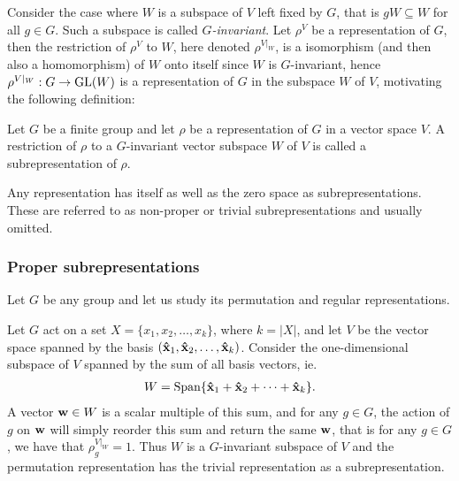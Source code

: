 Consider the case where $W$ is a subspace of $V$ left fixed by $G$, that is $gW \subseteq W$ for all $g \in G$. Such a subspace is called \textit{$G$-invariant}. Let $\rho^V$ be a representation of $G$, then the restriction of $\rho^V$ to $W$, here denoted $\rho^{V|_W}$, is a isomorphism (and then also a homomorphism) of $W$ onto itself since $W$ is $G$-invariant, hence $\rho^{V|_W}: G \rightarrow \text{GL}(W)$ is a representation of $G$ in the subspace $W$ of $V$, motivating the following definition:

\begin{definition}[Subrepresentation]\label{def:subrepr}
	Let $G$ be a finite group and let $\rho$ be a representation of $G$ in a vector space $V$. A restriction of $\rho$ to a $G$-invariant vector subspace $W$ of $V$ is called a subrepresentation of $\rho$.
\end{definition}


\begin{example}
	Any representation has itself as well as the zero space as subrepresentations. These are referred to as non-proper or trivial subrepresentations and usually omitted.
\end{example}

\subsubsection{Proper subrepresentations}

Let $G$ be any group and let us study its permutation and regular representations. 

\begin{example}\cite[Example 1.4.3.]{Sagan}\label{example:trivpermrepr}
	Let $G$ act on a set $X = \{x_1, x_2, \dots, x_k\}$, where $k = |X|$, and let $V$ be the vector space spanned by the basis $(\mathbf{\hat{x}}_1, \mathbf{\hat{x}}_2, \dots, \mathbf{\hat{x}}_k)$. Consider the one-dimensional subspace of $V$ spanned by the sum of all basis vectors, ie. 
	\begin{align*}	
		W = \text{Span}\{ \mathbf{\hat{x}}_1 + \mathbf{\hat{x}}_2 + \dots + \mathbf{\hat{x}}_k \}.
	\end{align*}A vector $\mathbf{w} \in W$ is a scalar multiple of this sum, and for any $g \in G$, the action of $g$ on $\mathbf{w}$ will simply reorder this sum and return the same $\mathbf{w}$, that is for any $g \in G$, we have that $\rho_g^{V|_W} = 1$. Thus $W$ is a $G$-invariant subspace of $V$ and the permutation representation has the trivial representation as a subrepresentation.
\end{example}

